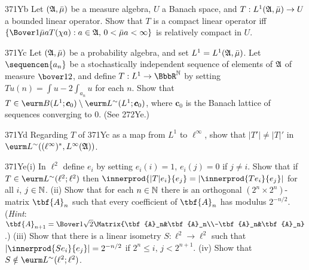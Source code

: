 {\spheader 371Yb Let $(\frak A,\bar\mu)$ be a measure algebra, $U$ a
Banach space, and $T:L^1(\frak A,\bar\mu)\to U$ a bounded linear
operator.   Show that $T$ is a compact linear operator iff
$\{\Bover1{\bar\mu a}T(\chi a):a\in\frak A,\,0<\bar\mu a<\infty\}$ is
relatively compact in $U$.

\spheader 371Yc Let $(\frak A,\bar\mu)$ be a probability algebra, and
set $L^1=L^1(\frak A,\bar\mu)$.   Let $\sequencen{a_n}$ be a
stochastically
independent sequence of elements of $\frak A$ of measure $\bover12$, and
define $T:L^1\to\BbbR^{\Bbb N}$ by setting
$Tu(n)=\int u-2\int_{a_n}u$ for each $n$.   Show that
$T\in\eurm B(L^1;\pmb{c}_0)\setminus\eurm L^{\sim}(L^1;\pmb{c}_0)$,
where $\pmb{c}_0$
is the Banach lattice of sequences converging to $0$.   (See
272Ye.)

\spheader 371Yd Regarding $T$ of 371Yc as a map from $L^1$ to
$\ell^{\infty}$, show that $|T'|\ne|T|'$ in $\eurm
L^{\sim}((\ell^{\infty})^*,L^{\infty}(\frak A))$.

\spheader 371Ye(i) In $\ell^2$ define $e_i$ by setting $e_i(i)=1$,
$e_i(j)=0$ if $j\ne i$.   Show that if
$T\in\eurm L^{\sim}(\ell^2;\ell^2)$ then
$\innerprod{|T|e_i}{e_j}=|\innerprod{Te_i}{e_j}|$ for all $i$,
$j\in\Bbb N$.   (ii) Show that for each $n\in\Bbb N$ there is an
orthogonal
$(2^n\times 2^n)$-matrix $\tbf{A}_n$ such that every coefficient of
$\tbf{A}_n$ has modulus $2^{-n/2}$.   ({\it Hint\/}:  $\tbf{A}_{n+1}
=\Bover1{\sqrt 2}\Matrix{\tbf{A}_n&\tbf{A}_n\\-\tbf{A}_n&\tbf{A}_n}$.)
(iii) Show that there is a linear isometry $S:\ell^2\to\ell^2$ such that
$|\innerprod{Se_i}{e_j}|=2^{-n/2}$ if $2^n\le i,\,j<2^{n+1}$.   (iv)
Show that $S\notin\eurm L^{\sim}(\ell^2;\ell^2)$.

}%


\discrpage

